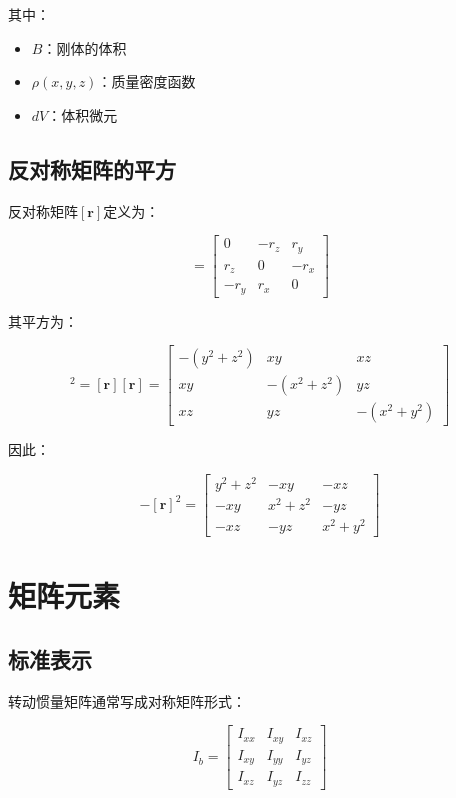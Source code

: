 \documentclass[12pt,a4paper]{article}
\begin{document}
其中：
\begin{itemize}
\item $B$：刚体的体积
\item $\rho(x, y, z)$：质量密度函数
\item $dV$：体积微元
\end{itemize}

\subsection{反对称矩阵的平方}

反对称矩阵$[\bm{r}]$定义为：

\begin{equation}
[\bm{r}] = \begin{bmatrix}
0 & -r_z & r_y \\
r_z & 0 & -r_x \\
-r_y & r_x & 0
\end{bmatrix}
\end{equation}

其平方为：

\begin{equation}
[\bm{r}]^2 = [\bm{r}][\bm{r}] = \begin{bmatrix}
-(y^2 + z^2) & xy & xz \\
xy & -(x^2 + z^2) & yz \\
xz & yz & -(x^2 + y^2)
\end{bmatrix}
\end{equation}

因此：

\begin{equation}
-[\bm{r}]^2 = \begin{bmatrix}
y^2 + z^2 & -xy & -xz \\
-xy & x^2 + z^2 & -yz \\
-xz & -yz & x^2 + y^2
\end{bmatrix}
\end{equation}

\section{矩阵元素}

\subsection{标准表示}

转动惯量矩阵通常写成对称矩阵形式：

\begin{equation}
I_b = \begin{bmatrix}
I_{xx} & I_{xy} & I_{xz} \\
I_{xy} & I_{yy} & I_{yz} \\
I_{xz} & I_{yz} & I_{zz}
\end{bmatrix}
\label{eq:inertia_matrix}
\end{equation}
\end{document}

